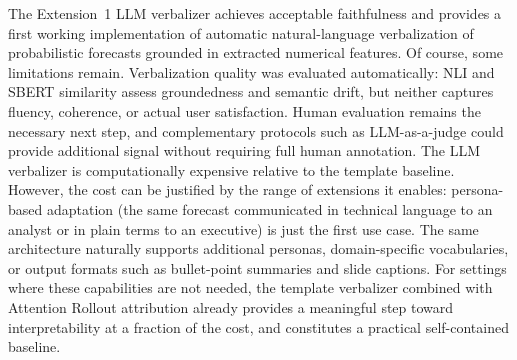 \documentclass[conference]{IEEEtran}
\begin{document}
The Extension~1 LLM verbalizer achieves acceptable faithfulness and provides a first working implementation of automatic natural-language verbalization of probabilistic forecasts grounded in extracted numerical features. Of course, some limitations remain. Verbalization quality was evaluated automatically: NLI and SBERT similarity assess groundedness and semantic drift, but neither captures fluency, coherence, or actual user satisfaction. Human evaluation remains the necessary next step, and complementary protocols such as LLM-as-a-judge could provide additional signal without requiring full human annotation. The LLM verbalizer is computationally expensive relative to the template baseline. However, the cost can be justified by the range of extensions it enables: persona-based adaptation (the same forecast communicated in technical language to an analyst or in plain terms to an executive) is just the first use case. The same architecture naturally supports additional personas, domain-specific vocabularies, or output formats such as bullet-point summaries and slide captions. For settings where these capabilities are not needed, the template verbalizer combined with Attention Rollout attribution already provides a meaningful step toward interpretability at a fraction of the cost, and constitutes a practical self-contained baseline.
\end{document}
